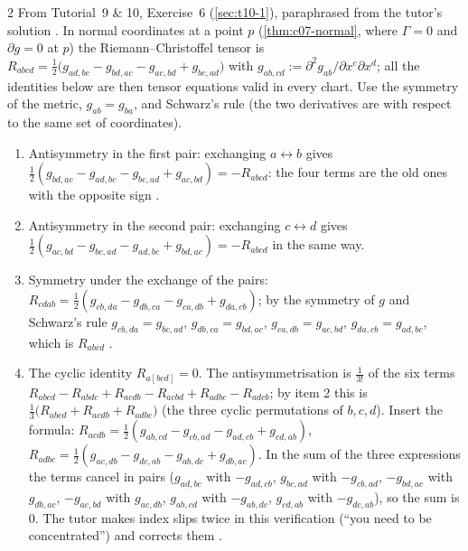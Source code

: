 \begin{paracol}{2}
From Tutorial~9 \& 10, Exercise~6 (\cref{sec:t10-1}), paraphrased from the tutor's solution . In normal coordinates at a point $p$ (\cref{thm:c07-normal}, where $\Gamma=0$ and $\partial g=0$ at $p$) the Riemann--Christoffel tensor is $R_{abcd}=\tfrac12\bigl(g_{ad,bc}-g_{bd,ac}-g_{ac,bd}+g_{bc,ad}\bigr)$ with $g_{ab,cd}:=\partial^2g_{ab}/\partial x^c\partial x^d$; all the identities below are then tensor equations valid in every chart. Use the symmetry of the metric, $g_{ab}=g_{ba}$, and Schwarz's rule (the two derivatives are with respect to the same set of coordinates).
\begin{enumerate}
  \item Antisymmetry in the first pair: exchanging $a\leftrightarrow b$ gives $\tfrac12(g_{bd,ac}-g_{ad,bc}-g_{bc,ad}+g_{ac,bd})=-R_{abcd}$: the four terms are the old ones with the opposite sign .
  \item Antisymmetry in the second pair: exchanging $c\leftrightarrow d$ gives $\tfrac12(g_{ac,bd}-g_{bc,ad}-g_{ad,bc}+g_{bd,ac})=-R_{abcd}$ in the same way.
  \item Symmetry under the exchange of the pairs: $R_{cdab}=\tfrac12(g_{cb,da}-g_{db,ca}-g_{ca,db}+g_{da,cb})$; by the symmetry of $g$ and Schwarz's rule $g_{cb,da}=g_{bc,ad}$, $g_{db,ca}=g_{bd,ac}$, $g_{ca,db}=g_{ac,bd}$, $g_{da,cb}=g_{ad,bc}$, which is $R_{abcd}$ .
  \item The cyclic identity $R_{a[bcd]}=0$. The antisymmetrisation is $\tfrac1{3!}$ of the six terms $R_{abcd}-R_{abdc}+R_{acdb}-R_{acbd}+R_{adbc}-R_{adcb}$; by item 2 this is $\tfrac13\bigl(R_{abcd}+R_{acdb}+R_{adbc}\bigr)$ (the three cyclic permutations of $b,c,d$). Insert the formula: $R_{acdb}=\tfrac12(g_{ab,cd}-g_{cb,ad}-g_{ad,cb}+g_{cd,ab})$, $R_{adbc}=\tfrac12(g_{ac,db}-g_{dc,ab}-g_{ab,dc}+g_{db,ac})$. In the sum of the three expressions the terms cancel in pairs ($g_{ad,bc}$ with $-g_{ad,cb}$, $g_{bc,ad}$ with $-g_{cb,ad}$, $-g_{bd,ac}$ with $g_{db,ac}$, $-g_{ac,bd}$ with $g_{ac,db}$, $g_{ab,cd}$ with $-g_{ab,dc}$, $g_{cd,ab}$ with $-g_{dc,ab}$), so the sum is $0$. The tutor makes index slips twice in this verification (``you need to be concentrated'') and corrects them .
\end{enumerate}


\end{paracol}
